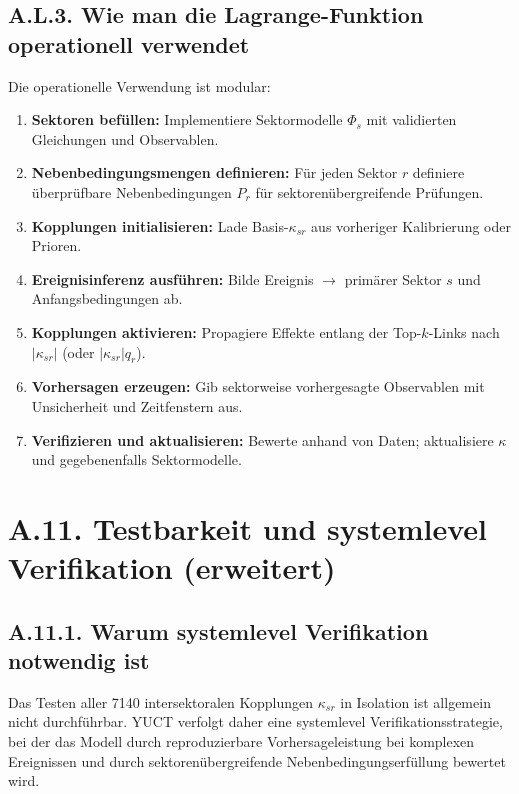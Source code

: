 \documentclass[13pt,a4paper]{article}
\begin{document}
	\subsection*{A.L.3. Wie man die Lagrange-Funktion operationell verwendet}
	Die operationelle Verwendung ist modular:
	\begin{enumerate}[leftmargin=*]
		\item \textbf{Sektoren befüllen:} Implementiere Sektormodelle $\Phi_s$ mit validierten Gleichungen und Observablen.
		\item \textbf{Nebenbedingungsmengen definieren:} Für jeden Sektor $r$ definiere überprüfbare Nebenbedingungen $P_r$ für sektorenübergreifende Prüfungen.
		\item \textbf{Kopplungen initialisieren:} Lade Basis-$\kappa_{sr}$ aus vorheriger Kalibrierung oder Prioren.
		\item \textbf{Ereignisinferenz ausführen:} Bilde Ereignis $\to$ primärer Sektor $s$ und Anfangsbedingungen ab.
		\item \textbf{Kopplungen aktivieren:} Propagiere Effekte entlang der Top-$k$-Links nach $|\kappa_{sr}|$ (oder $|\kappa_{sr}|q_r$).
		\item \textbf{Vorhersagen erzeugen:} Gib sektorweise vorhergesagte Observablen mit Unsicherheit und Zeitfenstern aus.
		\item \textbf{Verifizieren und aktualisieren:} Bewerte anhand von Daten; aktualisiere $\kappa$ und gegebenenfalls Sektormodelle.
	\end{enumerate}
	
	\section*{A.11. Testbarkeit und systemlevel Verifikation (erweitert)}
	\label{sec:extended-testability}
	
	\subsection*{A.11.1. Warum systemlevel Verifikation notwendig ist}
	Das Testen aller 7140 intersektoralen Kopplungen $\kappa_{sr}$ in Isolation ist allgemein nicht durchführbar. YUCT verfolgt daher eine systemlevel Verifikationsstrategie, bei der das Modell durch reproduzierbare Vorhersageleistung bei komplexen Ereignissen und durch sektorenübergreifende Nebenbedingungserfüllung bewertet wird.
	
\end{document}
